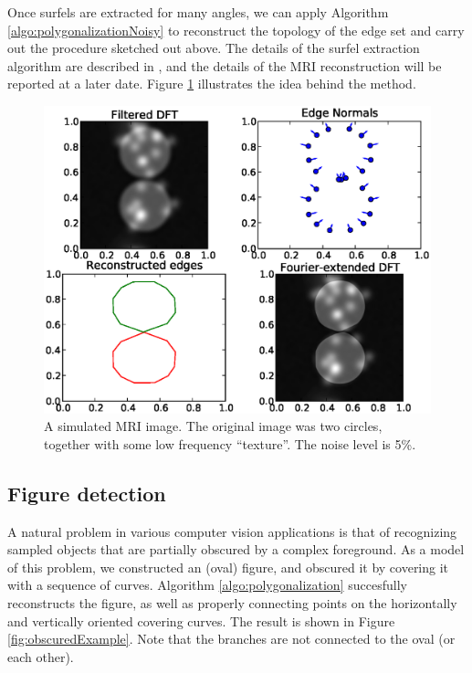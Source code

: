 \documentclass{article}
\numberwithin{cntr}{section}
\numberwithin{equation}{section}
\begin{document}
Once surfels are extracted for many angles, we can apply Algorithm \ref{algo:polygonalizationNoisy} to reconstruct the topology of the edge set and carry out the procedure sketched out above. The details of the surfel extraction algorithm are described in \cite{WAVEFRONT}, and the details of the MRI reconstruction will be reported at a later date. Figure \ref{fig:mriExample} illustrates the idea behind the method.

\begin{figure}
\setlength{\unitlength}{0.240900pt}
\ifx\plotpoint\undefined\newsavebox{\plotpoint}\fi
\sbox{\plotpoint}{\rule[-0.200pt]{0.400pt}{0.400pt}}%
\includegraphics[scale=0.5]{mri_edges.eps}
\caption{A simulated MRI image. The original image was two circles, together with some low frequency ``texture''. The noise level is 5\%.}
\label{fig:mriExample}
\end{figure}

\subsection{Figure detection}

A natural problem in various computer vision applications is that of
recognizing sampled objects that are partially obscured by a
complex foreground.
As a model of this problem, we constructed an (oval)
figure, and obscured it by covering it with a sequence of curves.
Algorithm \ref{algo:polygonalization} succesfully reconstructs the
figure, as well as properly connecting points on the
horizontally and vertically oriented covering curves.
The result is shown in
Figure \ref{fig:obscuredExample}. Note that the branches are not
connected to the oval (or each other).
\end{document}

